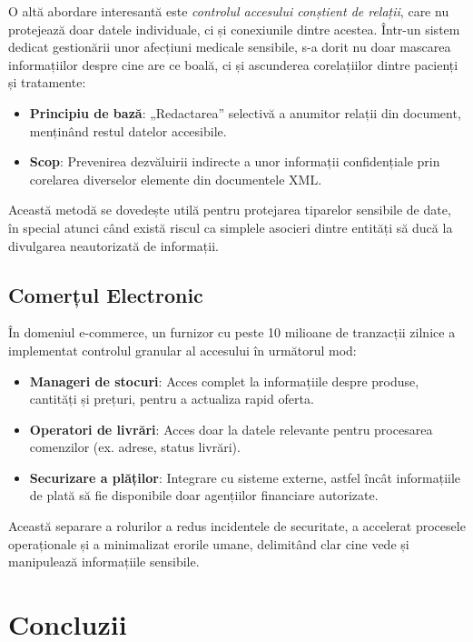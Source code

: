 \documentclass[runningheads]{llncs}
\begin{document}
O altă abordare interesantă este \textit{controlul accesului conștient de relații}, care nu protejează doar datele individuale, ci și conexiunile dintre acestea. Într-un sistem dedicat gestionării unor afecțiuni medicale sensibile, s-a dorit nu doar mascarea informațiilor despre cine are ce boală, ci și ascunderea corelațiilor dintre pacienți și tratamente:

\begin{itemize}
   \item \textbf{Principiu de bază}: „Redactarea” selectivă a anumitor relații din document, menținând restul datelor accesibile.
   \item \textbf{Scop}: Prevenirea dezvăluirii indirecte a unor informații confidențiale prin corelarea diverselor elemente din documentele XML.
\end{itemize}

Această metodă se dovedește utilă pentru protejarea tiparelor sensibile de date, în special atunci când există riscul ca simplele asocieri dintre entități să ducă la divulgarea neautorizată de informații.

\subsection{Comerțul Electronic}

În domeniul e-commerce, un furnizor cu peste 10 milioane de tranzacții zilnice a implementat controlul granular al accesului în următorul mod:

\begin{itemize}
   \item \textbf{Manageri de stocuri}: Acces complet la informațiile despre produse, cantități și prețuri, pentru a actualiza rapid oferta.
   \item \textbf{Operatori de livrări}: Acces doar la datele relevante pentru procesarea comenzilor (ex. adrese, status livrări).
   \item \textbf{Securizare a plăților}: Integrare cu sisteme externe, astfel încât informațiile de plată să fie disponibile doar agențiilor financiare autorizate.
\end{itemize}

Această separare a rolurilor a redus incidentele de securitate, a accelerat procesele operaționale și a minimalizat erorile umane, delimitând clar cine vede și manipulează informațiile sensibile.

\section{Concluzii}
\end{document}
